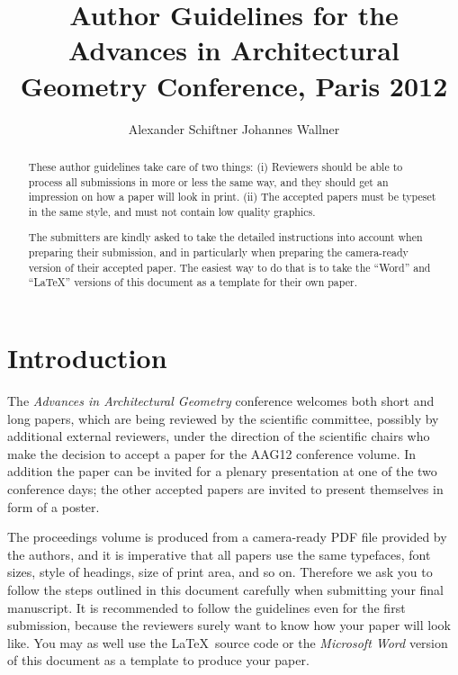 \documentclass[twoside]{article}
\begin{document}
\title{Author Guidelines for the Advances in Architectural
	Geometry Conference, Paris 2012}

\author{Alexander Schiftner 
	Johannes Wallner }

\maketitle

\def\shortauthor{A. Schiftner and J.\ Wallner}  %
\def\shorttitle{Author Guidelines for AAG}   %


\begin{abstract} These author guidelines take care of two things: (i) 
Reviewers should be able to process all submissions in more or less the 
same way, and they should get an impression on how a paper will look in 
print. (ii) The accepted papers must be typeset in the same style, and 
must not contain low quality graphics. 

The submitters are kindly asked to 
take the detailed instructions into account when preparing their 
submission, and in particularly when preparing the camera-ready version of 
their accepted paper. The easiest way to do that is to take the ``Word'' 
and ``\LaTeX'' versions of this document as a template for their own paper. 
\end{abstract}

\section{Introduction}

The {\em Advances in Architectural Geometry} conference welcomes both 
short and long papers, which are being reviewed by the scientific 
committee, possibly by additional external reviewers, under the direction 
of the scientific chairs who make the decision to accept a paper for the 
AAG12 conference volume. In addition the paper can be invited for a 
plenary presentation at one of the two conference days; the other accepted 
papers are invited to present themselves in form of a poster.

The proceedings volume is produced from a camera-ready PDF file provided 
by the authors, and it is imperative that all papers use the same 
typefaces, font sizes, style of headings, size of print area, and so on. 
Therefore we ask you to follow the steps outlined in this document 
carefully when submitting your final manuscript. It is recommended to 
follow the guidelines even for the first submission, because the reviewers 
surely want to know how your paper will look like. You may as well use the 
\LaTeX\ source code or the {\em Microsoft Word} version of this document 
as a template to produce your paper.
\end{document}
